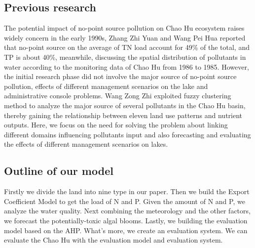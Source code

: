 \documentclass[12pt,a4paper]{article}
\begin{document}
\subsection{Previous research}
The potential impact of no-point source pollution on Chao Hu ecosystem raises widely concern in the early 1990s, Zhang Zhi Yuan and Wang Pei Hua reported that no-point source on the average of TN load account for 49\% of the total, and TP is about 40\%, meanwhile, discussing the spatial distribution of pollutants in water according to the monitoring data of Chao Hu from 1986 to 1985. However, the initial research phase did not involve the major source of no-point source pollution, effects of different management scenarios on the lake and administrative console problems. Wang Zong Zhi exploited fuzzy clustering method to analyze the major source of several pollutants in the Chao Hu basin, thereby gaining the relationship between eleven land use patterns and nutrient outputs. Here, we focus on the need for solving the problem about linking different domains influencing pollutants input and also forecasting and evaluating the effects of different management scenarios on lakes.\par

\subsection{Outline of our model}
Firstly we divide the land into nine type in our paper. Then we build the Export Coefficient Model to get the load of N and P. Given the amount of N and P, we analyze the water quality. Next combining the meteorology and the other factors, we forecast the potentially-toxic algal blooms. Lastly, we building the evaluation model based on the AHP. What's more, we create an evaluation system. We can evaluate the Chao Hu with the evaluation model and evaluation system.\par
\end{document}

